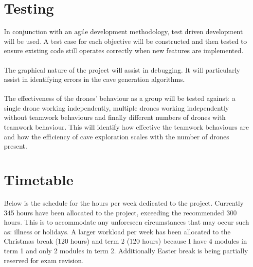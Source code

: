 \documentclass[12pt]{article}
\begin{document}
\pagebreak[4]

\section{Testing}
In conjunction with an agile development methodology, test driven development will be used. A test case for each objective will be constructed and then tested to ensure existing code still operates correctly when new features are implemented.
\\\\
The graphical nature of the project will assist in debugging. It will particularly assist in identifying errors in the cave generation algorithms.
\\\\
The effectiveness of the drones' behaviour as a group will be tested against: a single drone working independently, multiple drones working independently without teamwork behaviours and finally different numbers of drones with teamwork behaviour. This will identify how effective the teamwork behaviours are and how the efficiency of cave exploration scales with the number of drones present.


\section{Timetable}

Below is the schedule for the hours per week dedicated to the project. Currently 345 hours have been allocated to the project, exceeding the recommended 300 hours. This is to accommodate any unforeseen circumstances that may occur such as: illness or holidays. A larger workload per week has been allocated to the Christmas break (120 hours) and term 2 (120 hours) because I have 4 modules in term 1 and only 2 modules in term 2. Additionally Easter break is being partially reserved for exam revision.

% 
\end{document}
